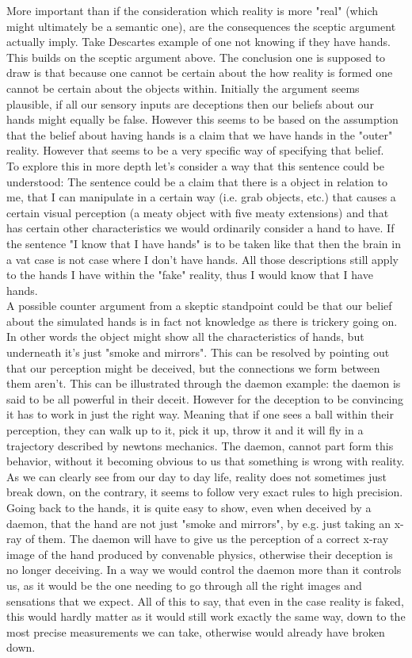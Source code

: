 \documentclass[14pt]{article}
\begin{document}
More important than if the consideration which reality is more "real" (which might ultimately be a semantic one), are the consequences the sceptic argument
actually imply. Take Descartes example of one not knowing if they have hands. This builds on the sceptic argument above. The conclusion one is supposed to
draw is that because one cannot be certain about the how reality is formed one cannot be certain about the objects within. Initially the argument seems
plausible, if all our sensory inputs are deceptions then our beliefs about our hands might equally be false.
However this seems to be based on the assumption that the belief about having hands is a claim that we have hands in the "outer" reality. However that seems
to be a very specific way of specifying that belief.\\
To explore this in more depth let's consider a way that this sentence could be understood: The sentence could be a claim that there is a object in relation
to me, that I can manipulate in a certain way (i.e. grab objects, etc.) that causes a certain visual perception (a meaty object with five meaty extensions)
and that has certain other characteristics we would ordinarily consider a hand to have.
If the sentence "I know that I have hands" is to be taken like that then the brain in a vat case is not case where I don't have hands. All those
descriptions still apply to the hands I have within the "fake" reality, thus I would know that I have hands.\\

A possible counter argument from a skeptic standpoint could be that our belief about the simulated hands is in fact not knowledge as there is trickery going on.
In other words the object might show all the characteristics of hands, but underneath it's just "smoke and mirrors". This can be resolved by pointing out that
our perception might be deceived, but the connections we form between them aren't. This can be illustrated through the daemon example: the daemon is said to be all
powerful in their deceit. However for the deception to be convincing it has to work in just the right way. Meaning that if one sees a ball within their perception,
they can walk up to it, pick it up, throw it and it will fly in a trajectory described by newtons mechanics. The daemon, cannot part form this behavior, without it becoming
obvious to us that something is wrong with reality. As we can clearly see from our day to day life, reality does not sometimes just break down, on the contrary, it
seems to follow very exact rules to high precision. Going back to the hands, it is quite easy to show, even when deceived by a daemon, that the hand are not just
"smoke and mirrors", by e.g. just taking an x-ray of them. The daemon will have to give us the perception of a correct x-ray image of the hand produced by convenable
physics, otherwise their deception is no longer deceiving. In a way we would control the daemon more than it controls us, as it would be the one needing to go through
all the right images and sensations that we expect. All of this to say, that even in the case reality is faked, this would hardly matter as it would still
work exactly the same way, down to the most precise measurements we can take, otherwise would already have broken down.\\
\end{document}
